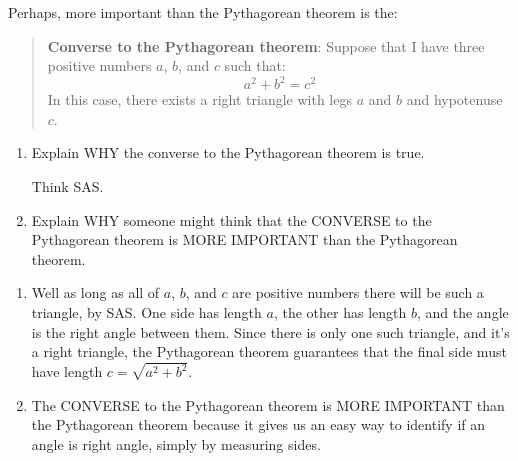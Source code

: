 \documentclass[noauthor,nooutcomes,handout,hints]{ximera}
\begin{document}
\begin{question}
  Perhaps, more important than the Pythagorean theorem is the:
  \begin{quote}
    \textbf{Converse to the Pythagorean theorem}:
    Suppose that I have three positive numbers $a$, $b$, and $c$ such that:
    \[
    a^2 + b^2 = c^2
    \]
    In this case, there exists a right triangle with legs $a$ and $b$
    and hypotenuse $c$.
  \end{quote}
  \begin{enumerate}
  \item Explain WHY the converse to the Pythagorean theorem is true.
    \begin{hint}
      Think SAS. 
    \end{hint}
  \item Explain WHY someone might think that the CONVERSE to the
    Pythagorean theorem is MORE IMPORTANT than the Pythagorean
    theorem.
  \end{enumerate}
    \begin{freeResponse}
      \begin{enumerate}
      \item Well as long as all of $a$, $b$, and $c$ are positive numbers there
        will be such a triangle, by SAS.  One side has length $a$, the
        other has length $b$, and the angle is the right angle between
        them. Since there is only one such triangle, and it's a right
        triangle, the Pythagorean theorem guarantees that the final side
        must have length $c = \sqrt{a^2+b^2}$.
      \item The CONVERSE to the Pythagorean theorem is MORE IMPORTANT
        than the Pythagorean theorem because it gives us an easy way
        to identify if an angle is right angle, simply by measuring
        sides.
      \end{enumerate}
      \end{freeResponse}
  
\end{question}
\end{document}
